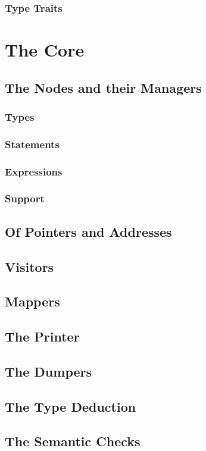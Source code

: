 \subsubsection{Type Traits}

\section{The Core}
\subsection{The Nodes and their Managers}
\subsubsection{Types}
\subsubsection{Statements}
\subsubsection{Expressions}
\subsubsection{Support}

\subsection{Of Pointers and Addresses}
\subsection{Visitors}
\subsection{Mappers}
\subsection{The Printer}
\subsection{The Dumpers}
\subsection{The Type Deduction}
\subsection{The Semantic Checks}
